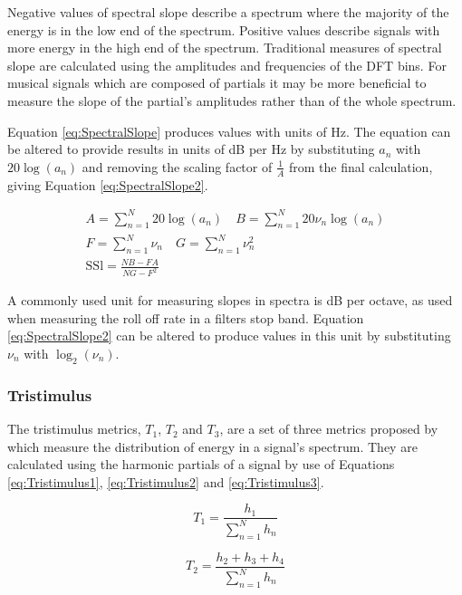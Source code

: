			Negative values of spectral slope describe a spectrum where the majority of the energy is in the
			low end of the spectrum. Positive values describe signals with more energy in the high end of the
			spectrum. Traditional measures of spectral slope are calculated using the amplitudes and
			frequencies of the DFT bins. For musical signals which are composed of partials it may be more
			beneficial to measure the slope of the partial's amplitudes rather than of the whole spectrum. 
			
			Equation \ref{eq:SpectralSlope} produces values with units of Hz. The equation can be
			altered to provide results in units of dB per Hz by substituting $a_{n}$ with $20\log(a_{n})$ and
			removing the scaling factor of $\frac{1}{A}$ from the final calculation, giving Equation
			\ref{eq:SpectralSlope2}.
			
			\begin{gather}
				A = \sum_{n = 1}^{N} 20\log(a_{n})
				\quad 
				B = \sum_{n = 1}^{N} 20\nu_{n}\log(a_{n}) \nonumber \\
				F = \sum_{n = 1}^{N} \nu_{n} \quad G = \sum_{n = 1}^{N} \nu_{n}^{2} \nonumber \\
				\textrm{SSl} = \frac{NB - FA}{NG - F^{2}}
				\label{eq:SpectralSlope2}
			\end{gather}
			
			A commonly used unit for measuring slopes in spectra is dB per octave, as used when measuring the
			roll off rate in a filters stop band. Equation \ref{eq:SpectralSlope2} can be altered to produce
			values in this unit by substituting $\nu_{n}$ with $\log_{2}(\nu_{n})$.

		\subsubsection*{Tristimulus}
			The tristimulus metrics, $T_{1}$, $T_{2}$ and $T_{3}$, are a set of three metrics proposed by
			\citet{pollard1982a} which measure the distribution of energy in a signal's spectrum. They are
			calculated using the harmonic partials of a signal by use of Equations \ref{eq:Tristimulus1},
			\ref{eq:Tristimulus2} and \ref{eq:Tristimulus3}.
			
			\begin{equation}
				T_{1} = \frac{h_{1}}{\sum_{n = 1}^{N} h_{n}}
				\label{eq:Tristimulus1}
			\end{equation}

			\begin{equation}
				T_{2} = \frac{h_{2} + h_{3} + h_{4}}{\sum_{n = 1}^{N} h_{n}}
				\label{eq:Tristimulus2}
			\end{equation}

